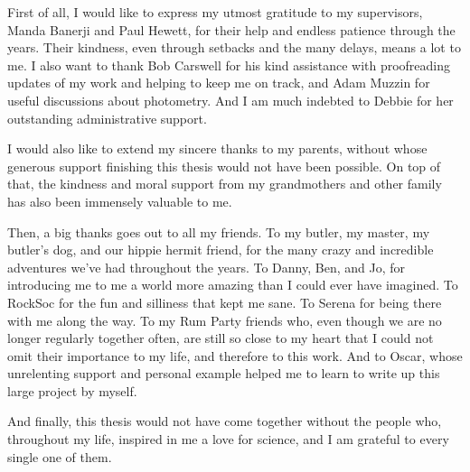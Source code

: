 
\begin{acknowledgements}    

First of all, I would like to express my utmost gratitude to my supervisors, Manda Banerji and Paul Hewett, for their help and endless patience through the years. Their kindness, even through setbacks and the many delays, means a lot to me. I also want to thank Bob Carswell for his kind assistance with proofreading updates of my work and helping to keep me on track, and Adam Muzzin for useful discussions about photometry. And I am much indebted to Debbie for her outstanding administrative support. \par

I would also like to extend my sincere thanks to my parents, without whose generous support finishing this thesis would not have been possible. On top of that, the kindness and moral support from my grandmothers and other family has also been immensely valuable to me. 




Then, a big thanks goes out to all my friends. To my butler, my master, my butler's dog, and our hippie hermit friend, for the many crazy and incredible adventures we've had throughout the years. To Danny, Ben, and Jo, for introducing me to me a world more amazing than I could ever have imagined. To RockSoc for the fun and silliness that kept me sane. To Serena for being there with me along the way. To my Rum Party friends who, even though we are no longer regularly together often, are still so close to my heart that I could not omit their importance to my life, and therefore to this work. And to Oscar, whose unrelenting support and personal example helped me to learn to write up this large project by myself. \par

And finally, this thesis would not have come together without the people who, throughout my life, inspired in me a love for science, and I am grateful to every single one of them. %



\end{acknowledgements}
